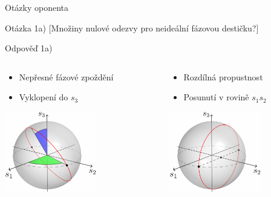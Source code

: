 \begin{frame}{Otázky oponenta}
    \begin{block}{Otázka 1a)}
        [Množiny nulové odezvy pro neideální fázovou destičku?]
    \end{block}
    \begin{exampleblock}{Odpověď 1a)}
        \begin{columns}
            \begin{column}{0.5\textwidth}
                \begin{itemize}
                    \item Nepřesné fázové zpoždění
                    \item Vyklopení do $s_3$ 
                \end{itemize} 
                \includegraphics[width=4cm]{img/kovek-4.pdf}
            \end{column}
            \begin{column}{0.5\textwidth}
                \begin{itemize}
                    \item Rozdílná propustnost
                    \item Posunutí v rovině $s_1s_2$
                \end{itemize} 
                \includegraphics[width=4cm]{img/kovek-6.pdf}
            \end{column}
        \end{columns}
    \end{exampleblock}
\end{frame}

